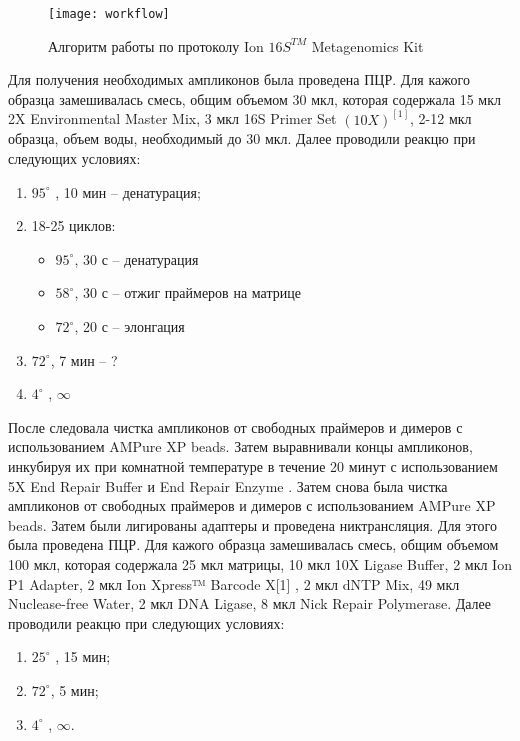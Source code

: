 \begin{figure}[h]
  \texttt{[image: workflow]}
  \centering
  \caption{Алгоритм работы по протоколу Ion $16S^{TM}$ Metagenomics Kit }
  \label{img:workflow}  
\end{figure}

Для получения необходимых ампликонов была проведена ПЦР. Для кажого образца замешивалась смесь, общим объемом 30 мкл, которая содержала 15 мкл 2X Environmental Master Mix, 3 мкл 16S Primer Set $(10X)^{[1]}$, 2-12 мкл образца, объем воды, необходимый до 30 мкл.  Далее проводили реакцю при следующих условиях:

\begin{enumerate}
	\item $95^{\circ}$ , 10 мин – денатурация;
	\item 18-25 циклов:
	\begin{itemize}
		\item $95^{\circ}$, 30 с – денатурация
		\item $58^{\circ}$, 30 с – отжиг праймеров на матрице
		\item $72^{\circ}$, 20 с – элонгация
	\end{itemize}
	\item $72^{\circ}$, 7 мин – ?
	\item $4^{\circ}$ ,  $\infty$
\end{enumerate}

После следовала чистка ампликонов от свободных праймеров и димеров с использованием AMPure XP beads. Затем выравнивали концы ампликонов, инкубируя их при комнатной температуре в течение 20 минут с использованием 5X End Repair Buffer и End Repair Enzyme . Затем снова была чистка ампликонов от свободных праймеров и димеров с использованием AMPure XP beads. Затем были лигированы адаптеры и проведена никтрансляция. Для этого была проведена ПЦР. Для кажого образца замешивалась смесь, общим объемом 100 мкл, которая содержала 25 мкл матрицы, 10 мкл 10X Ligase Buffer, 2 мкл Ion P1 Adapter, 2 мкл Ion Xpress™ Barcode X[1] , 2 мкл dNTP Mix, 49 мкл Nuclease-free Water, 2 мкл DNA Ligase, 8 мкл Nick Repair Polymerase.   Далее проводили реакцю при следующих условиях:

\begin{enumerate}
	\item $25^{\circ}$ , 15 мин;
	\item $72^{\circ}$, 5 мин;
	\item $4^{\circ}$ ,  $\infty$.
\end{enumerate}

